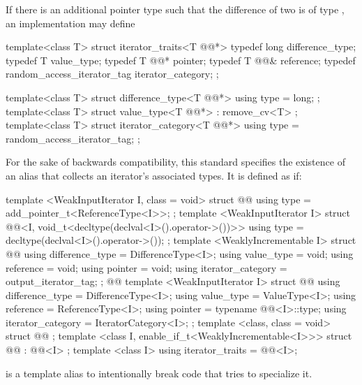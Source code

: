 \pnum
\enternote
If there is an additional pointer type
such that the difference of two
is of type
,
an implementation may define

\begin{removedblock}
\begin{codeblock}
  template<class T> struct iterator_traits<T @@*> {
    typedef long difference_type;
    typedef T value_type;
    typedef T @@* pointer;
    typedef T @@& reference;
    typedef random_access_iterator_tag iterator_category;
  };
\end{codeblock}
\end{removedblock}
\begin{addedblock}
\begin{codeblock}
  template<class T> struct difference_type<T @@*> {
    using type = long;
  };
  template<class T> struct value_type<T @@*> : remove_cv<T> { };
  template<class T> struct iterator_category<T @@*> {
    using type = random_access_iterator_tag;
  };
\end{codeblock}
\end{addedblock}
\exitnote

\begin{addedblock}
\pnum
For the sake of backwards compatibility, this standard specifies the existence of an 
alias that collects an iterator's associated types. It is defined as if:


\begin{codeblock}
  template <WeakInputIterator I, class = void> struct @@ {
    using type = add_pointer_t<ReferenceType<I>>;
  };
  template <WeakInputIterator I>
  struct @@<I, void_t<decltype(declval<I>().operator->())>> {
    using type = decltype(declval<I>().operator->());
  };
  template <WeaklyIncrementable I> struct @@ {
    using difference_type = DifferenceType<I>;
    using value_type = void;
    using reference = void;
    using pointer = void;
    using iterator_category = output_iterator_tag;
  };
  @@
  template <WeakInputIterator I> struct @@ {
    using difference_type = DifferenceType<I>;
    using value_type = ValueType<I>;
    using reference = ReferenceType<I>;
    using pointer = typename @@<I>::type;
    using iterator_category = IteratorCategory<I>;
  };
  template <class, class = void> struct @@ { };
  template <class I, enable_if_t<WeaklyIncrementable<I>>>
  struct @@ : @@<I> { };
  template <class I>
    using iterator_traits = @@<I>;
\end{codeblock}

\pnum
\enternote
{} is a template alias to intentionally break code that tries to specialize
it.
\exitnote

\end{addedblock}

